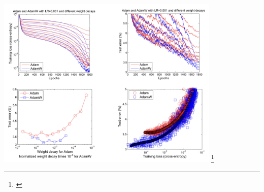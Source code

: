 \documentclass[serif]{beamer}  %
\begin{document}
    \begin{frame}
    \centering
    \includegraphics[width=0.8\textwidth]{images/adamw_com.png}
    \footnote{\cite{loshchilov2019decoupledweightdecayregularization}}
    \end{frame}



\end{document}
